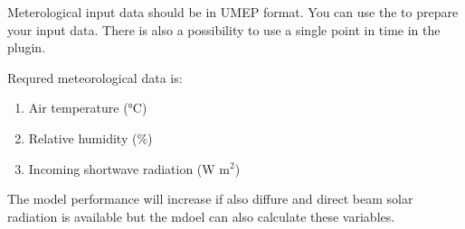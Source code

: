 \documentclass[letterpaper,10pt,english]{sphinxmanual}
\begin{document}
Meterological input data should be in UMEP format. You can use the
{\hyperref[\detokenize{pre-processor/Meteorological Data MetPreprocessor:metpreprocessor}]{}}
to prepare your input data. There is also a possibility to use a single point in time in the plugin.

Requred meteorological data is:
\begin{enumerate}
\item {} 
Air temperature (°C)

\item {} 
Relative humidity (\%)

\item {} 
Incoming shortwave radiation (W m$^{\text{2}}$)

\end{enumerate}

The model performance will increase if also diffure and direct beam solar radiation is
available but the mdoel can also calculate these variables.
\end{document}

